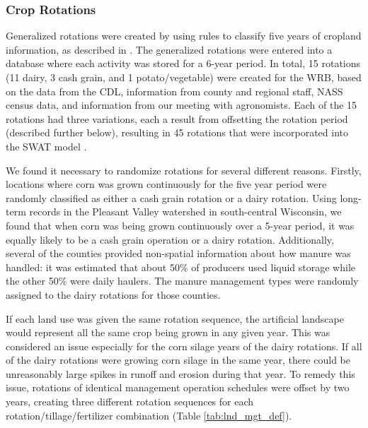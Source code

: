 \subsubsection{Crop Rotations}

Generalized rotations were created by using rules to classify five years of cropland information, as described in .  
The generalized rotations were entered into a database where each activity was stored for a 6-year
period. In total, 15 rotations (11 dairy, 3 cash grain, and 1 potato/vegetable) were created for the WRB,
based on the data from the CDL, information from county and regional staff, NASS census data, and
information from our meeting with agronomists. Each of the 15 rotations had three
variations, each a result from offsetting the rotation period (described further below), resulting in 45 rotations that were incorporated into the SWAT model .


We found it necessary to randomize rotations for several different reasons. Firstly, locations where corn was grown continuously for the five year period were randomly classified as either a cash grain rotation or a dairy rotation. Using long-term records in the Pleasant Valley watershed in south-central Wisconsin, we found that when corn was being grown continuously over a 5-year period, it was equally likely to be a cash grain operation or a dairy rotation. Additionally, several of the counties provided non-spatial information about how manure was handled: it was estimated that about 50\% of producers used liquid storage while the other 50\% were daily haulers. The manure management types were randomly assigned to the dairy rotations for those counties.  

If each land use was given the same rotation sequence, the artificial landscape would represent all the same crop being grown in any given year. This was considered an issue especially for the corn silage years of the dairy rotations. If all of the dairy rotations were growing corn silage in the same year, there could be unreasonably large spikes in runoff and erosion during that year. To remedy this issue, rotations of identical management operation schedules were offset by two years, creating three different rotation sequences for each rotation/tillage/fertilizer combination (Table \ref{tab:lnd_mgt_def}).
